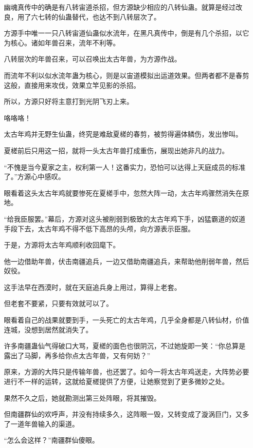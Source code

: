 \begin{this_body}
幽魂真传中的确是有八转宙道杀招，但方源缺少相应的八转仙蛊。就算是经过改良，用了六七转的仙蛊替代，也达不到八转层次了。

方源手中唯一一只八转宙道仙蛊似水流年，在黑凡真传中，倒是有几个杀招，以它为核心。诸如年兽召来，流年不利等。

八转层次的年兽召来，可以召唤出太古年兽，为方源作战。

而流年不利以似水流年蛊为核心，则是以宙道模拟出运道效果。但两者都不是春剪这般，直接用来攻伐，效果立竿见影的杀招。

所以，方源只好将主意打到光阴飞刃上来。

咯咯咯！

太古年鸡并无野生仙蛊，终究是难敌夏槎的春剪，被剪得遍体鳞伤，发出惨叫。

夏槎前后只用这一招，就将一头太古年兽打成重伤，展现出她非凡的战力。

“不愧是当今夏家之主，权利第一人！这番实力，恐怕可以达得上天庭成员的标准了。”方源心中感叹。

眼看着这头太古年鸡就要惨死在夏槎手中，忽然大阵一动，太古年鸡骤然消失在原地。

“给我臣服罢。”幕后，方源对这头被削弱到极致的太古年鸡下手，凶猛霸道的奴道手段下去，太古年鸡不得不低下高昂的头颅，向方源表示臣服。

于是，方源将太古年鸡顺利收回麾下。

他一边借助年兽，伏击南疆追兵，一边又借助南疆追兵，来帮助他削弱年兽，然后奴役。

这手法早在西漠时，就在天庭追兵身上用过，算得上老套。

但老套不要紧，只要有效就可以了。

眼看着自己的战果就要到手，一头死亡的太古年鸡，几乎全身都是八转仙材，价值连城，没想到居然就消失了。

许多南疆蛊仙气得破口大骂，夏槎的面色也很阴沉，不过她旋即一笑：“你总算是露出了马脚，再多给你点太古年兽，又有何妨？”

原来，方源的大阵只是传输年兽，也还罢了。如今一将太古年鸡送走，大阵势必要进行不一样的运转，这就给夏槎提供了方便，让她察觉到了更多微妙之处。

果然不久之后，她就勘测出第三处阵眼，将其摧毁。

但南疆群仙的欢呼声，并没有持续多久，这阵眼一毁，又转变成了漩涡巨门，又多了一道年兽输入的渠道。

“怎么会这样？”南疆群仙傻眼。

\end{this_body}

